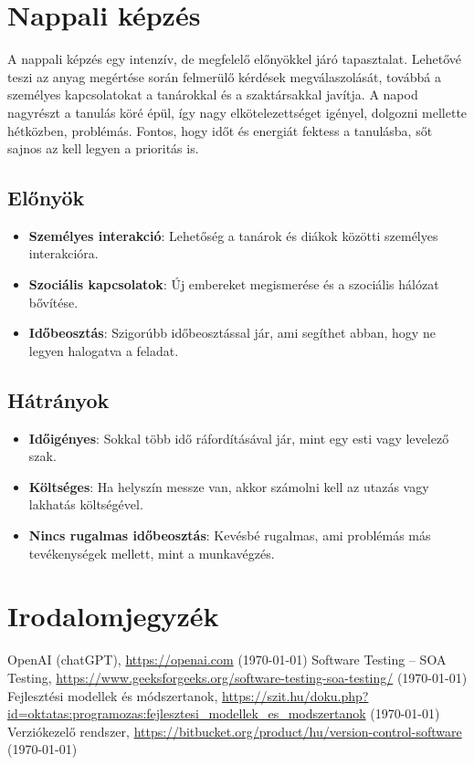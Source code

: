 \documentclass{report}
\begin{document}
		
	\chapter{Nappali képzés}
		A nappali képzés egy intenzív, de megfelelő előnyökkel járó tapasztalat. 
		Lehetővé teszi az anyag megértése során felmerülő kérdések megválaszolását, továbbá a személyes kapcsolatokat a tanárokkal és a szaktársakkal javítja.
		A napod nagyrészt a tanulás köré épül, így nagy elkötelezettséget igényel, dolgozni mellette hétközben, problémás. 
		Fontos, hogy időt és energiát fektess a tanulásba, sőt sajnos az kell legyen a prioritás is.


		\begin{multicols}{2}

			\section{Előnyök}
				 \begin{itemize} 
					\item \textbf{Személyes interakció}: Lehetőség a tanárok és diákok közötti személyes interakcióra.
					\item \textbf{Szociális kapcsolatok}: Új embereket megismerése és a szociális hálózat bővítése.
					\item \textbf{Időbeosztás}: Szigorúbb időbeosztással jár, ami segíthet abban, hogy ne legyen halogatva a feladat.

				\end{itemize}
			\columnbreak
			\section{Hátrányok}
				 \begin{itemize} 
					\item \textbf{Időigényes}: Sokkal több idő ráfordításával jár, mint egy esti vagy levelező szak.
					\item \textbf{Költséges}: Ha helyszín messze van, akkor számolni kell az utazás vagy lakhatás költségével.
					\item \textbf{Nincs rugalmas időbeosztás}:  Kevésbé rugalmas, ami problémás más tevékenységek mellett, mint a munkavégzés.
				\end{itemize}
		\end{multicols}

		

		
	\chapter*{Irodalomjegyzék}
		\begin{thebibliography}{9}
		     OpenAI (chatGPT), \url{https://openai.com} (\today)
		     Software Testing – SOA Testing, \url{https://www.geeksforgeeks.org/software-testing-soa-testing/} (\today)
		     Fejlesztési modellek és módszertanok, \url{https://szit.hu/doku.php?id=oktatas:programozas:fejlesztesi_modellek_es_modszertanok} (\today)
		     Verziókezelő rendszer, \url{https://bitbucket.org/product/hu/version-control-software} (\today)
		\end{thebibliography}
\end{document}

